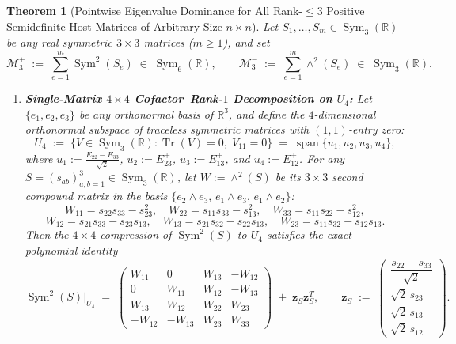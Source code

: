 \documentclass[11pt,a4paper]{article}
\theoremstyle{plain}
\newtheorem{theorem}{Theorem}[section]
\theoremstyle{definition}
\theoremstyle{remark}
\DeclareMathOperator{\Tr}{Tr}
\DeclareMathOperator{\Sym}{Sym}
\begin{document}
\begin{theorem}[Pointwise Eigenvalue Dominance for All Rank-$\le 3$ Positive Semidefinite Host Matrices of Arbitrary Size $n \times n$]\label{thm:rank3_psd}
Let $S_1,\dots,S_m \in \Sym_3(\mathbb{R})$ be any real symmetric $3 \times 3$ matrices ($m \ge 1$), and set
\[
  \mathcal{M}_3^+ \;:=\; \sum_{e=1}^m \Sym^2(S_e) \;\in\; \Sym_6(\mathbb{R}), \qquad
  \mathcal{M}_3^- \;:=\; \sum_{e=1}^m \wedge^2(S_e) \;\in\; \Sym_3(\mathbb{R}).
\]
\begin{enumerate}[label=(\alph*)]
  \item \textbf{Single-Matrix $4 \times 4$ Cofactor--Rank-$1$ Decomposition on $U_4$:} Let $\{e_1, e_2, e_3\}$ be any orthonormal basis of $\mathbb{R}^3$, and define the $4$-dimensional orthonormal subspace of traceless symmetric matrices with $(1,1)$-entry zero:
  \begin{equation}\label{eq:U4_def}
    U_4 \;:=\; \big\{V \in \Sym_3(\mathbb{R}) : \Tr(V) = 0, \; V_{11} = 0\big\} \;=\; \operatorname{span}\big\{u_1, u_2, u_3, u_4\big\},
  \end{equation}
  where $u_1 := \frac{E_{22} - E_{33}}{\sqrt{2}}$, $u_2 := E_{23}^+$, $u_3 := E_{13}^+$, and $u_4 := E_{12}^+$. For any $S = (s_{ab})_{a,b=1}^3 \in \Sym_3(\mathbb{R})$, let $W := \wedge^2(S)$ be its $3 \times 3$ second compound matrix in the basis $\{e_2 \wedge e_3, \, e_1 \wedge e_3, \, e_1 \wedge e_2\}$:
  \[
    W_{11} = s_{22}s_{33} - s_{23}^2, \quad W_{22} = s_{11}s_{33} - s_{13}^2, \quad W_{33} = s_{11}s_{22} - s_{12}^2,
  \]
  \[
    W_{12} = s_{21}s_{33} - s_{23}s_{13}, \quad W_{13} = s_{21}s_{32} - s_{22}s_{13}, \quad W_{23} = s_{11}s_{32} - s_{12}s_{13}.
  \]
  Then the $4 \times 4$ compression of $\Sym^2(S)$ to $U_4$ satisfies the exact polynomial identity
  \begin{equation}\label{eq:U4_single_S}
    \boxed{\Sym^2(S)\big|_{U_4} \;=\; \begin{pmatrix}
      W_{11} & 0 & W_{13} & -W_{12} \\
      0 & W_{11} & W_{12} & -W_{13} \\
      W_{13} & W_{12} & W_{22} & W_{23} \\
      -W_{12} & -W_{13} & W_{23} & W_{33}
    \end{pmatrix} \;+\; \mathbf{z}_S \mathbf{z}_S^T, \qquad
    \mathbf{z}_S \;:=\; \begin{pmatrix} \dfrac{s_{22} - s_{33}}{\sqrt{2}} \\[6pt] \sqrt{2}\, s_{23} \\[4pt] \sqrt{2}\, s_{13} \\[4pt] \sqrt{2}\, s_{12} \end{pmatrix}.}

\end{equation}
\end{enumerate}
\end{theorem}
\end{document}
